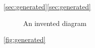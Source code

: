 \def\labelKey{sec:generated}
\label{\labelKey}\ref{sec:generated}\ref{\labelKey}
\begin{figure}\caption{An invented diagram}\label{\figureKey}\end{figure}
\ref{fig:generated}
\nocite{*}
